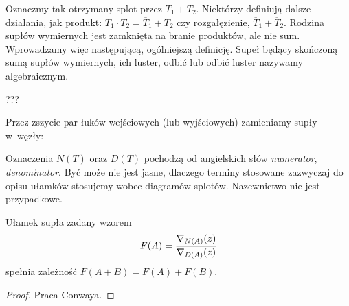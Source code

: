 Oznaczmy tak otrzymany splot przez $T_1 + T_2$.
Niektórzy definiują dalsze działania, jak produkt: $T_1 \cdot T_2 = \overline T_1 + T_2$ czy rozgałęzienie, $\overline T_1 + \overline T_2$.
Rodzina supłów wymiernych jest zamknięta na branie produktów, ale nie sum.
Wprowadzamy więc następującą, ogólniejszą definicję.
Supeł będący skończoną sumą supłów wymiernych, ich luster, odbić lub odbić luster nazywamy algebraicznym.

\begin{tobedone}[notacja Conwaya]
    \label{conway_notation}
    ???
\end{tobedone}

Przez zszycie par łuków wejściowych (lub wyjściowych) zamieniamy supły w~węzły:
\begin{figure}[H]
    \centering
    \begin{minipage}[b]{.3\linewidth}
        \centering
        \LargeTangleFraction
    \end{minipage}
    \begin{minipage}[b]{.3\linewidth}
        \centering
        \LargeTangleFractionNumerator
    \end{minipage}
    \begin{minipage}[b]{.3\linewidth}
        \centering
        \LargeTangleFractionDenominator
    \end{minipage}
\end{figure}

Oznaczenia $N(T)$ oraz $D(T)$ pochodzą od angielskich słów \emph{numerator}, \emph{denominator}.
Być może nie jest jasne, dlaczego terminy stosowane zazwyczaj do opisu ułamków stosujemy wobec diagramów splotów.
Nazewnictwo nie jest przypadkowe.

\begin{proposition}
    Ułamek supła zadany wzorem
    \begin{equation}
        F(A) = \frac{\nabla_{N(A)}(z)}{\nabla_{D(A)}(z)}
    \end{equation}
    spełnia zależność $F(A+B) = F(A) + F(B)$.
\end{proposition}

\begin{proof}
    Praca \cite{conway70} Conwaya.
\end{proof}

